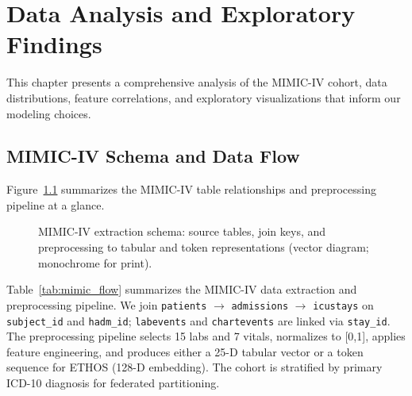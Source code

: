 \chapter{Data Analysis and Exploratory Findings}
\label{ch:data_analysis}

This chapter presents a comprehensive analysis of the MIMIC-IV cohort, data distributions, feature correlations, and exploratory visualizations that inform our modeling choices.

\section{MIMIC-IV Schema and Data Flow}

Figure~\ref{fig:mimic_schema} summarizes the MIMIC-IV table relationships and preprocessing pipeline at a glance.

\begin{figure}[htbp]
\centering
\resizebox{0.95\textwidth}{!}{}
\caption{MIMIC-IV extraction schema: source tables, join keys, and preprocessing to tabular and token representations (vector diagram; monochrome for print).}
\label{fig:mimic_schema}
\end{figure}

Table~\ref{tab:mimic_flow} summarizes the MIMIC-IV data extraction and preprocessing pipeline. We join \texttt{patients} $\to$ \texttt{admissions} $\to$ \texttt{icustays} on \texttt{subject\_id} and \texttt{hadm\_id}; \texttt{labevents} and \texttt{chartevents} are linked via \texttt{stay\_id}. The preprocessing pipeline selects 15 labs and 7 vitals, normalizes to [0,1], applies feature engineering, and produces either a 25-D tabular vector or a token sequence for ETHOS (128-D embedding). The cohort is stratified by primary ICD-10 diagnosis for federated partitioning.

